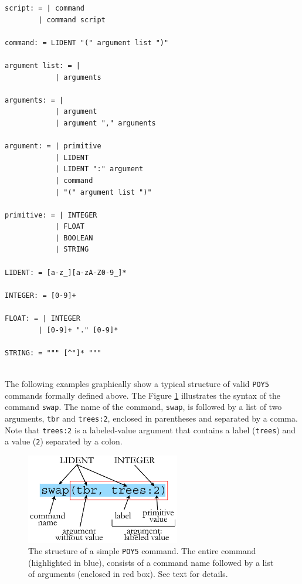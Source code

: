 \documentclass[11pt]{book}
\newcommand{\commandstyle}[1]{\texttt{#1}}
\newcommand{\poycommand}[1]{\commandstyle{#1}}
\newcommand{\poyargument}[1]{\commandstyle{#1}}
\newcommand{\poy}{\commandstyle{POY5}\xspace}
\begin{document}
\begin{verbatim}
script: = | command
        | command script

command: = LIDENT "(" argument list ")"

argument list: = |
            | arguments

arguments: = |
            | argument
            | argument "," arguments

argument: = | primitive
            | LIDENT
            | LIDENT ":" argument
            | command
            | "(" argument list ")"

primitive: = | INTEGER
            | FLOAT
            | BOOLEAN
            | STRING

LIDENT: = [a-z_][a-zA-Z0-9_]*

INTEGER: = [0-9]+

FLOAT: = | INTEGER
        | [0-9]+ "." [0-9]*

STRING: = """ [^"]* """


\end{verbatim}

The following examples graphically show a typical structure of valid \poy commands
formally defined above. The Figure \ref{simplecommand} illustrates
the syntax of the command \poycommand{swap}. The name of the
command, \poycommand{swap}, is followed by a list of two arguments,
\poyargument{tbr} and \poyargument{trees:2}, enclosed in parentheses
and separated by a comma. Note that \poyargument{trees:2} is a labeled-value
argument that contains a label (\texttt{trees}) and a value (\texttt{2})
separated by a colon.

\begin{figure}[htbp]
   \centering
   \includegraphics[width=0.60\textwidth]{doc/figures/fig-poycommand1.jpg}
   \caption{The structure of a simple \poy command. The entire command (highlighted
   in blue), consists of  a command name followed by a list of arguments (enclosed in red box).
   See text for details.}
   \label{simplecommand}
\end{figure}
\end{document}
